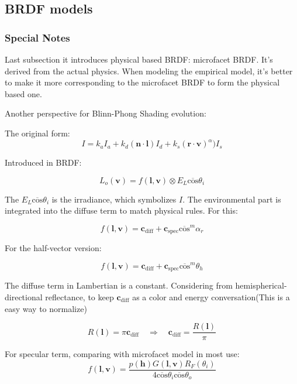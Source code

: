 \documentclass[10pt, a4paper]{article}
\begin{document}
    \subsection{BRDF models}

        \subsubsection{Special Notes}
            Last subsection it introduces physical based BRDF: microfacet BRDF. It's derived from the actual physics. When modeling the empirical model, it's better to make it more corresponding to the microfacet BRDF to form the physical based one. 
            
            Another perspective for Blinn-Phong Shading evolution: 

            The original form: 
            $$I = k_aI_a + k_d(\textbf{n}\cdot \textbf{l})I_d + k_s(\textbf{r} \cdot \textbf{v})^{\alpha})I_s$$
            
            Introduced in BRDF: 

            $$L_o(\textbf{v}) = f(\textbf{l}, \textbf{v}) \otimes E_L\overline{\text{cos}}\theta_{i}$$

            The $E_L\overline{\text{cos}}\theta_i$ is the irradiance, which symbolizes $I$. The environmental part is integrated into the diffuse term to match physical rules. For this:

            $$f(\textbf{l}, \textbf{v}) = \textbf{c}_{\text{diff}} + \textbf{c}_{\text{spec}}\overline{\text{cos}}^m\alpha_r$$

            For the half-vector version: 

            $$f(\textbf{l}, \textbf{v}) = \textbf{c}_{\text{diff}} + \textbf{c}_{\text{spec}}\overline{\text{cos}}^m\theta_h$$            

            The diffuse term in Lambertian is a constant. Considering from hemispherical-directional reflectance, to keep $\textbf{c}_{\text{diff}}$ as a color and energy conversation(This is a easy way to normalize)

            $$R(\textbf{l}) =  \pi\textbf{c}_{\text{diff}} \quad\Rightarrow\quad \textbf{c}_{\text{diff}} = \frac{R(\textbf{l})}{\pi}$$
            
            For specular term, comparing with microfacet model in most use: 
            $$f(\textbf{l}, \textbf{v}) = \frac{p(\textbf{h})G(\textbf{l}, \textbf{v})R_F(\theta_i)}{4\overline{\text{cos}}\theta_i\overline{\text{cos}}\theta_o}$$
\end{document}
